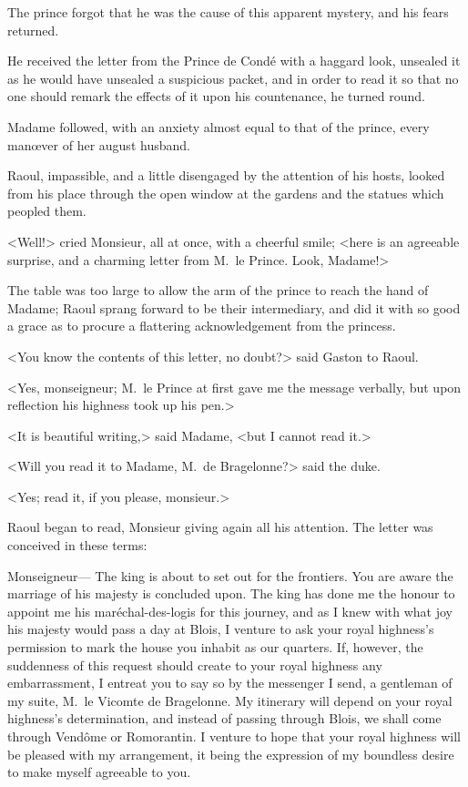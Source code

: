 The prince forgot that he was the cause of this apparent mystery, and his fears returned.

He received the letter from the Prince de Condé with a haggard look, unsealed it as he would have unsealed a suspicious packet, and in order to read it so that no one should remark the effects of it upon his countenance, he turned round.

Madame followed, with an anxiety almost equal to that of the prince, every manœver of her august husband.

Raoul, impassible, and a little disengaged by the attention of his hosts, looked from his place through the open window at the gardens and the statues which peopled them.

<Well!> cried Monsieur, all at once, with a cheerful smile; <here is an agreeable surprise, and a charming letter from M.~le Prince. Look, Madame!>

The table was too large to allow the arm of the prince to reach the hand of Madame; Raoul sprang forward to be their intermediary, and did it with so good a grace as to procure a flattering acknowledgement from the princess.

<You know the contents of this letter, no doubt?> said Gaston to Raoul.

<Yes, monseigneur; M.~le Prince at first gave me the message verbally, but upon reflection his highness took up his pen.>

<It is beautiful writing,> said Madame, <but I cannot read it.>

<Will you read it to Madame, M.~de Bragelonne?> said the duke.

<Yes; read it, if you please, monsieur.>

Raoul began to read, Monsieur giving again all his attention. The letter was conceived in these terms:

\begin{mail}{}{Monseigneur—}
The king is about to set out for the frontiers. You are aware the marriage of his majesty is concluded upon. The king has done me the honour to appoint me his maréchal-des-logis for this journey, and as I knew with what joy his majesty would pass a day at Blois, I venture to ask your royal highness's permission to mark the house you inhabit as our quarters. If, however, the suddenness of this request should create to your royal highness any embarrassment, I entreat you to say so by the messenger I send, a gentleman of my suite, M.~le Vicomte de Bragelonne. My itinerary will depend on your royal highness's determination, and instead of passing through Blois, we shall come through Vendôme or Romorantin. I venture to hope that your royal highness will be pleased with my arrangement, it being the expression of my boundless desire to make myself agreeable to you.
\end{mail}

